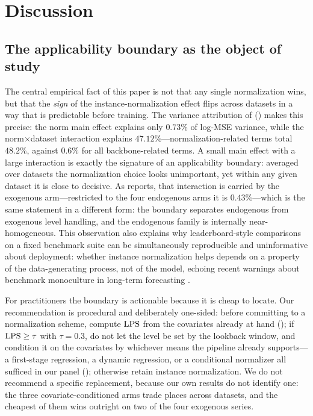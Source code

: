 \section{Discussion}\label{sec:discussion}

\subsection{The applicability boundary as the object of study}

The central empirical fact of this paper is not that any single normalization wins, but that the \emph{sign} of the instance-normalization effect flips across datasets in a way that is predictable before training. The variance attribution of  () makes this precise: the norm main effect explains only $0.73\%$ of log-MSE variance, while the norm$\times$dataset interaction explains $47.12\%$---normalization-related terms total $48.2\%$, against $0.6\%$ for all backbone-related terms. A small main effect with a large interaction is exactly the signature of an applicability boundary: averaged over datasets the normalization choice looks unimportant, yet within any given dataset it is close to decisive. As  reports, that interaction is carried by the exogenous arm---restricted to the four endogenous arms it is $0.43\%$---which is the same statement in a different form: the boundary separates endogenous from exogenous level handling, and the endogenous family is internally near-homogeneous. This observation also explains why leaderboard-style comparisons on a fixed benchmark suite can be simultaneously reproducible and uninformative about deployment: whether instance normalization helps depends on a property of the data-generating process, not of the model, echoing recent warnings about benchmark monoculture in long-term forecasting \citep{brigato2026champions,position2025benchmark}.

For practitioners the boundary is actionable because it is cheap to locate. Our recommendation is procedural and deliberately one-sided: before committing to a normalization scheme, compute $\mathrm{LPS}$ from the covariates already at hand (); if $\mathrm{LPS} \geq \tau$ with $\tau = 0.3$, do not let the level be set by the lookback window, and condition it on the covariates by whichever means the pipeline already supports---a first-stage regression, a dynamic regression, or a conditional normalizer all sufficed in our panel (); otherwise retain instance normalization. We do not recommend a specific replacement, because our own results do not identify one: the three covariate-conditioned arms trade places across datasets, and the cheapest of them wins outright on two of the four exogenous series.

